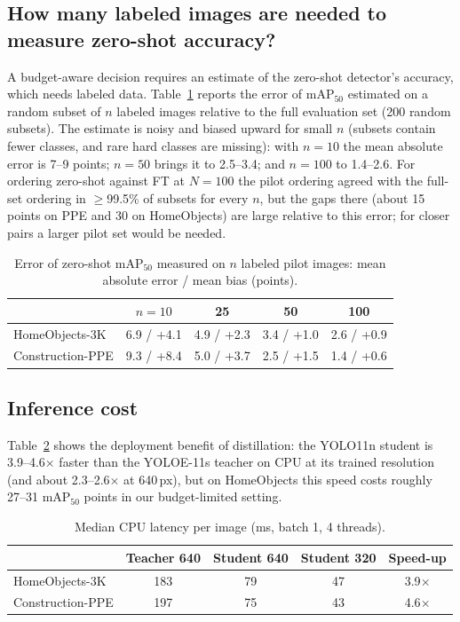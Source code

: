 \documentclass[conference]{IEEEtran}
\begin{document}
\subsection{How many labeled images are needed to measure zero-shot accuracy?}
A budget-aware decision requires an estimate of the zero-shot detector's accuracy, which needs labeled data. Table~\ref{tab:pilot} reports the error of mAP$_{50}$ estimated on a random subset of $n$ labeled images relative to the full evaluation set (200 random subsets). The estimate is noisy and biased upward for small $n$ (subsets contain fewer classes, and rare hard classes are missing): with $n{=}10$ the mean absolute error is 7--9 points; $n{=}50$ brings it to 2.5--3.4; and $n{=}100$ to 1.4--2.6. For ordering zero-shot against FT at $N{=}100$ the pilot ordering agreed with the full-set ordering in $\ge$99.5\% of subsets for every $n$, but the gaps there (about 15 points on PPE and 30 on HomeObjects) are large relative to this error; for closer pairs a larger pilot set would be needed.

\begin{table}[t]
\caption{Error of zero-shot mAP$_{50}$ measured on $n$ labeled pilot images: mean absolute error / mean bias (points).}
\label{tab:pilot}
\centering\footnotesize
\begin{tabular}{lcccc}
\toprule
 & $n{=}10$ & 25 & 50 & 100\\
\midrule
HomeObjects-3K & 6.9 / +4.1 & 4.9 / +2.3 & 3.4 / +1.0 & 2.6 / +0.9 \\
Construction-PPE & 9.3 / +8.4 & 5.0 / +3.7 & 2.5 / +1.5 & 1.4 / +0.6 \\
\bottomrule
\end{tabular}
\end{table}

\subsection{Inference cost}
Table~\ref{tab:speed} shows the deployment benefit of distillation: the YOLO11n student is 3.9--4.6$\times$ faster than the YOLOE-11s teacher on CPU at its trained resolution (and about 2.3--2.6$\times$ at 640\,px), but on HomeObjects this speed costs roughly 27--31 mAP$_{50}$ points in our budget-limited setting.

\begin{table}[t]
\caption{Median CPU latency per image (ms, batch 1, 4 threads).}
\label{tab:speed}
\centering\footnotesize
\begin{tabular}{lcccc}
\toprule
 & Teacher 640 & Student 640 & Student 320 & Speed-up\\
\midrule
HomeObjects-3K & 183 & 79 & 47 & 3.9$\times$ \\
Construction-PPE & 197 & 75 & 43 & 4.6$\times$ \\
\bottomrule
\end{tabular}
\end{table}
\end{document}
